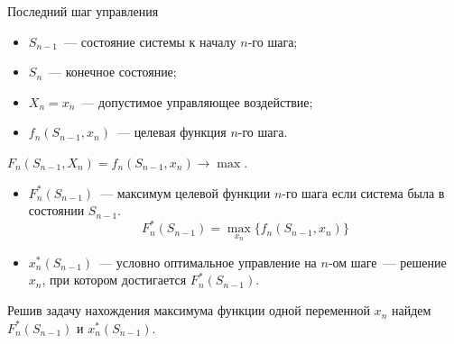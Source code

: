 \documentclass[unicode,11pt,notheorems,xcolor=table]{beamer}
\begin{document}
\begin{frame}{Последний шаг управления}


{\small
\begin{itemize}
\item 
	$S_{n-1}$~--- состояние системы к началу $n$-го шага;
\item 
	$S_n$~--- конечное состояние;
\item 
	$X_n=x_n$~--- допустимое управляющее воздействие;
\item 
	$f_n (S_{n-1},x_n)$~--- целевая функция $n$-го шага.
\end{itemize}\par}


 \alert{$F_n(S_{n-1},X_n) = f_n(S_{n-1},x_n) \to \max$}.

\begin{itemize}
\item 
\alert{$F_n^*(S_{n-1})$}~--- максимум целевой функции $n$-го шага если система была в состоянии $S_{n-1}$.
$$
F_n^*(S_{n-1}) = \max_{x_n} \big\{f_n(S_{n-1},x_n) \big\}
$$

\item 
 \alert{$x_n^*\left(S_{n-1}\right)$}~--- \alert{условно оптимальное управление на 
 $n$-ом шаге}~--- решение  $x_n$, при котором достигается  $F_n^*\left(S_{n-1}\right)$.
\end{itemize}

\begin{block}{}
Решив задачу нахождения максимума функции одной переменной $x_n$ найдем $F_n^*\left(S_{n-1}\right)$  и $x_n^*(S_{n-1})$.
\end{block}

\end{frame}
\end{document}
